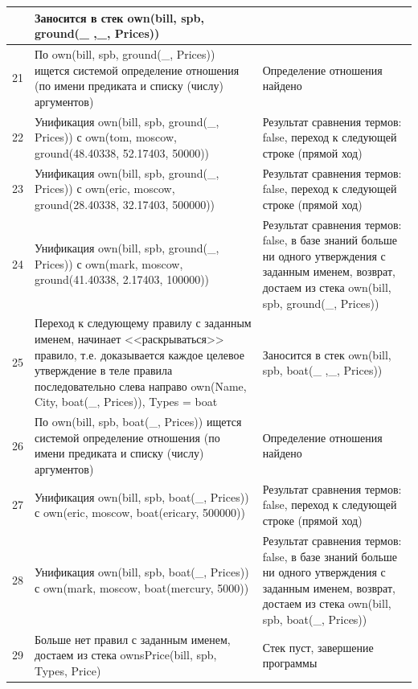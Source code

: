 \documentclass[a4paper,14pt]{extreport} %
\begin{document}
\begin{longtable}{|p{1.1cm}|p{8.5cm}|p{7cm}|}
	& Заносится в стек own(bill, spb, ground(\_ ,\_, Prices))\\ \hline

	21 & По own(bill, spb, ground(\_, Prices))  ищется системой определение отношения (по имени предиката и списку (числу) аргументов) & Определение отношения найдено \\ \hline
	22 & Унификация own(bill, spb, ground(\_, Prices)) с own(tom, moscow, ground(48.40338, 52.17403, 50000)) & Результат сравнения термов: false, переход к следующей строке (прямой ход) \\ \hline
	23 & Унификация own(bill, spb, ground(\_, Prices)) с own(eric, moscow, ground(28.40338, 32.17403, 500000)) & Результат сравнения термов: false, переход к следующей строке (прямой ход) \\ \hline
	24 & Унификация own(bill, spb, ground(\_, Prices)) с own(mark, moscow, ground(41.40338, 2.17403, 100000)) & Результат сравнения термов: false, в базе знаний больше ни одного утверждения с заданным именем, возврат, достаем из стека own(bill, spb, ground(\_, Prices)) \\ \hline

	25 & Переход к следующему правилу с заданным именем, начинает <<раскрываться>> правило, т.е. доказывается каждое целевое утверждение в теле правила последовательно слева направо
	own(Name, City, boat(\_, Prices)), Types = boat
	
	& Заносится в стек own(bill, spb, boat(\_ ,\_, Prices))\\ \hline

	26 & По own(bill, spb, boat(\_, Prices))  ищется системой определение отношения (по имени предиката и списку (числу) аргументов) & Определение отношения найдено \\ \hline
	27 & Унификация own(bill, spb, boat(\_, Prices)) с own(eric, moscow, boat(ericary, 500000)) & Результат сравнения термов: false, переход к следующей строке (прямой ход) \\ \hline
	28 & Унификация own(bill, spb, boat(\_, Prices)) с own(mark, moscow, boat(mercury, 5000)) & Результат сравнения термов: false, в базе знаний больше ни одного утверждения с заданным именем, возврат, достаем из стека own(bill, spb, boat(\_, Prices)) \\ \hline
	
	29 & Больше нет правил с заданным именем, достаем из стека ownsPrice(bill, spb, Types, Price) & Стек пуст, завершение программы \\ \hline
\end{longtable}
\end{document}
